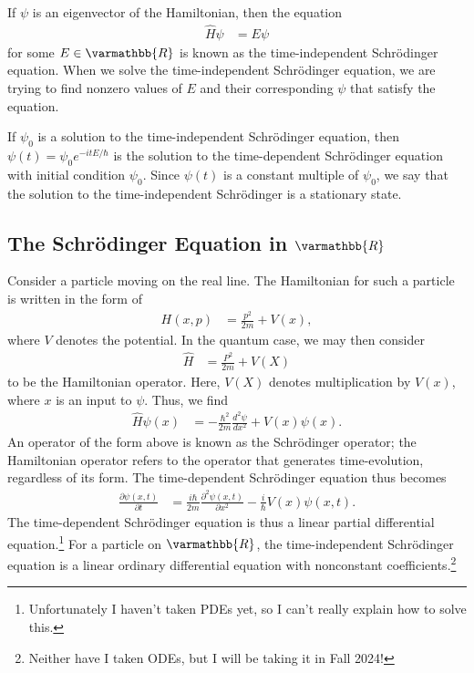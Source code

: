 \documentclass[12pt]{extarticle}
\newcommand{\R}{\varmathbb{R}}
\theoremstyle{plain}
\theoremstyle{definition}
\theoremstyle{remark}
\renewcommand{\newline}{\hfill\break}
\begin{document}
  If $\psi$ is an eigenvector of the Hamiltonian, then the equation
  \begin{align*}
    \hat{H}\psi &= E\psi
  \end{align*}
  for some $E\in \R$ is known as the time-independent Schrödinger equation. When we solve the time-independent Schrödinger equation, we are trying to find nonzero values of $E$ and their corresponding $\psi$ that satisfy the equation.\newline

  If $\psi_0$ is a solution to the time-independent Schrödinger equation, then $\displaystyle \psi(t) = \psi_0 e^{-itE/\hbar}$ is the solution to the time-dependent Schrödinger equation with initial condition $\psi_0$. Since $\psi(t)$ is a constant multiple of $\psi_0$, we say that the solution to the time-independent Schrödinger is a stationary state.
  \subsection{The Schrödinger Equation in $\R$}%
  Consider a particle moving on the real line. The Hamiltonian for such a particle is written in the form of
  \begin{align*}
    H(x,p) &= \frac{p^2}{2m} + V(x),
  \end{align*}
  where $V$ denotes the potential. In the quantum case, we may then consider
  \begin{align*}
    \hat{H} &= \frac{P^2}{2m} + V(X)
  \end{align*}
  to be the Hamiltonian operator. Here, $V(X)$ denotes multiplication by $V(x)$, where $x$ is an input to $\psi$. Thus, we find
  \begin{align*}
    \hat{H}\psi(x) &= -\frac{\hbar^2}{2m}\frac{d^2\psi}{dx^2} + V(x)\psi(x).
  \end{align*}
  An operator of the form above is known as the Schrödinger operator; the Hamiltonian operator refers to the operator that generates time-evolution, regardless of its form. The time-dependent Schrödinger equation thus becomes
  \begin{align*}
    \frac{\partial \psi(x,t)}{\partial t} &= \frac{i\hbar}{2m}\frac{\partial^2\psi(x,t)}{\partial x^2} - \frac{i}{\hbar}V(x)\psi(x,t).
  \end{align*}
  The time-dependent Schrödinger equation is thus a linear partial differential equation.\footnote{Unfortunately I haven't taken PDEs yet, so I can't really explain how to solve this.} For a particle on $\R$, the time-independent Schrödinger equation is a linear ordinary differential equation with nonconstant coefficients.\footnote{Neither have I taken ODEs, but I will be taking it in Fall 2024!}
\end{document}
